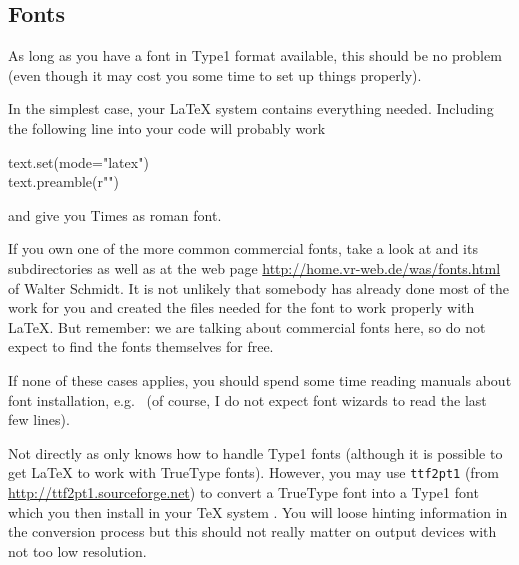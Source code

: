 \documentclass[11pt,DIV14]{scrartcl}
\begin{document}
\subsection{Fonts}

{}
{
}

{}
{\label{q:other_font}
As long as you have a font in Type1 format available, this should be no
problem (even though it may cost you some time to set up things properly).

In the simplest case, your \LaTeX{} system contains everything needed. 
Including the following line into your code will probably work
\begin{progcode}
text.set(mode="latex")\\
text.preamble(r"")
\end{progcode}
and give you Times as roman font. 

If you own one of the more common commercial fonts, take a look at
 and its subdirectories as well as at the web page
\url{http://home.vr-web.de/was/fonts.html} of Walter Schmidt. It is not
unlikely that somebody has already done most of the work for you and created
the files needed for the font to work properly with \LaTeX. But remember:
we are talking about commercial fonts here, so do not expect to find the fonts
themselves for free.

If none of these cases applies, you should spend some time reading
manuals about font installation, e.g.\ 
(of course, I do not expect font wizards to read the last few lines).
}

{}
{Not directly as \PyX{} only knows how to handle Type1 fonts (although it is
possible to get \LaTeX{} to work with TrueType fonts). However, you may use
\texttt{ttf2pt1} (from \url{http://ttf2pt1.sourceforge.net}) to convert a 
TrueType font into a Type1 font which you then install in your \TeX{} system 
. You will loose hinting information 
in the conversion process but this should not really matter on output devices 
with not too low resolution.
}
\end{document}
